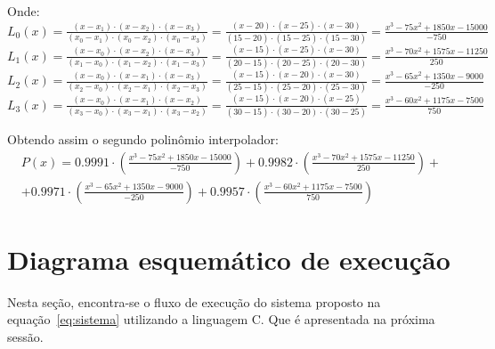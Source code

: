 \documentclass[12pt, hidelinks]{article}
\begin{document}
Onde: \\
$L_0(x) = \frac{(x - x_1)\cdot(x - x_2)\cdot(x - x_3)}{(x_0 - x_1)\cdot(x_0 - x_2)\cdot(x_0 - x_3)} = \frac{(x - 20)\cdot(x - 25)\cdot(x - 30)}{(15 - 20)\cdot(15 - 25)\cdot(15 - 30)} = \frac{x^3 - 75x^2 + 1850x - 15000}{-750}$\\
$L_1(x) = \frac{(x - x_0)\cdot(x - x_2)\cdot(x - x_3)}{(x_1 - x_0)\cdot(x_1 - x_2)\cdot(x_1 - x_3)} = \frac{(x - 15)\cdot(x - 25)\cdot(x - 30)}{(20 - 15)\cdot(20 - 25)\cdot(20 - 30)} = \frac{x^3 - 70x^2 + 1575x - 11250}{250}$\\
$L_2(x) = \frac{(x - x_0)\cdot(x - x_1)\cdot(x - x_3)}{(x_2 - x_0)\cdot(x_2 - x_1)\cdot(x_2 - x_3)} = \frac{(x - 15)\cdot(x - 20)\cdot(x - 30)}{(25 - 15)\cdot(25 - 20)\cdot(25 - 30)} = \frac{x^3 - 65x^2 + 1350x - 9000}{-250}$\\
$L_3(x) = \frac{(x - x_0)\cdot(x - x_1)\cdot(x - x_2)}{(x_3 - x_0)\cdot(x_3 - x_1)\cdot(x_3 - x_2)} = \frac{(x - 15)\cdot(x - 20)\cdot(x - 25)}{(30 - 15)\cdot(30 - 20)\cdot(30 - 25)} = \frac{x^3 - 60x^2 + 1175x - 7500}{750}$

Obtendo assim o segundo polinômio interpolador:
\begin{eqnarray}\label{eq:pi2}
  P(x) = 0.9991 \cdot \left(\frac{x^3 - 75x^2 + 1850x - 15000}{-750}\right) + 0.9982 \cdot \left(\frac{x^3 - 70x^2 + 1575x - 11250}{250}\right) + \nonumber \\
  + 0.9971 \cdot \left(\frac{x^3 - 65x^2 + 1350x - 9000}{-250}\right) + 0.9957 \cdot \left(\frac{x^3 - 60x^2 + 1175x - 7500}{750}\right)
\end{eqnarray}

\newpage
\section{Diagrama esquemático de execução}

Nesta seção, encontra-se o fluxo de execução do sistema proposto na equação~\eqref{eq:sistema} utilizando
a linguagem C. Que é apresentada na próxima sessão.
\end{document}
